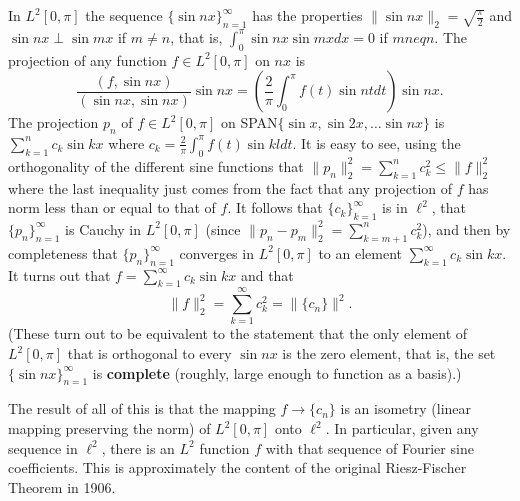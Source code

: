 \begin{rmk}
	In $L^2[0,\pi]$ the sequence $\{\sin nx\}_{n=1}^\infty$ has the properties 
	$\|\sin nx\|_2 = \sqrt{\frac{\pi}{2}}$ and $\sin nx \perp \sin mx$ if $m \neq n$, that is, 
	$\int_0^\pi \sin nx \sin mx dx = 0$ if $m neq n$. The projection of any function $f \in L^2[0,\pi]$ 
	on $nx$ is 
	\begin{equation*}
		\frac{(f,\sin nx)}{(\sin nx, \sin nx)}\sin nx = 
		\left(\frac{2}{\pi}\int_0^\pi f(t) \sin nt dt\right)\sin nx. 
	\end{equation*}
	The projection $p_n$ of $f \in L^2[0,\pi]$ on SPAN$\{\sin x, \sin 2x, \dots \sin nx\}$ is 
	$\sum\limits_{k=1}^n c_k\sin kx$ where $c_k = \frac{2}{\pi}\int_0^\pi f(t) \sin kl dt$. It is 
	easy to see, using the orthogonality of the different sine functions that $\|p_n\|_2^2 = 
	\sum\limits_{k=1}^nc_k^2 \le \|f\|_2^2$ where the last inequality just comes from the fact that 
	any projection of $f$ has norm less than or equal to that of $f$. It follows that $\{c_k\}_{k=1}^\infty$ 
	is in $\ell^2$, that $\{p_n\}_{n=1}^\infty$ is Cauchy in $L^2[0,\pi]$ (since $\|p_n - p_m\|_2^2 = 
	\sum\limits_{k=m+1}^nc_k^2$), and then by completeness that $\{p_n\}_{n=1}^\infty$ converges 
	in $L^2[0,\pi]$ to an element $\sum\limits_{k=1}^\infty c_k\sin kx$. It turns out that 
	$f = \sum\limits_{k=1}^\infty c_k \sin kx$ and that 
	\begin{equation*}
		\|f\|_2^2 = \sum\limits_{k=1}^\infty c_k^2  = \|\{c_n\}\|^2. 
	\end{equation*}
	(These turn out to be equivalent to the statement that the only element of $L^2[0,\pi]$ that 
	is orthogonal to every $\sin nx$ is the zero element, that is, the set $\{\sin nx\}_{n=1}^\infty$ 
	is \textbf{complete} (roughly, large enough to function as a basis).)

	The result of all of this is that the mapping $f\rightarrow \{c_n\}$ is an isometry (linear 
	mapping preserving the norm) of $L^2[0,\pi]$ onto $\ell^2$. In particular, given any 
	sequence in $\ell^2$, there is an $L^2$ function $f$ with that sequence of Fourier sine coefficients. 
	This is approximately the content of the original Riesz-Fischer Theorem in 1906.
\end{rmk}
